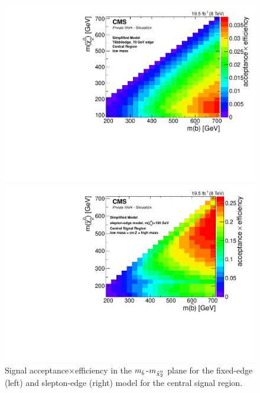 \begin{figure}[htbp]
\centering
\begin{minipage}[t]{0.49\textwidth}
  \includegraphics[width=\textwidth]{plots/limits/T6bblledge_70_GeV_Edge_Barrel_lowMll_signalEfficiency.pdf}
\end{minipage}
\begin{minipage}[t]{0.49\textwidth}
\includegraphics[width=\textwidth]{plots/limits/T6bbllslepton_m_n_1_100_Barrel_signalEfficiency_Reweighted.pdf}
\end{minipage}
\caption{Signal acceptance$\times$efficiency in the $m_{\tilde{b}}$-$m_{{\tilde{\chi}^0_2}}$ plane for the fixed-edge (left) and slepton-edge (right) model for the central signal region.}
\label{fig:sigEff}
\end{figure}
